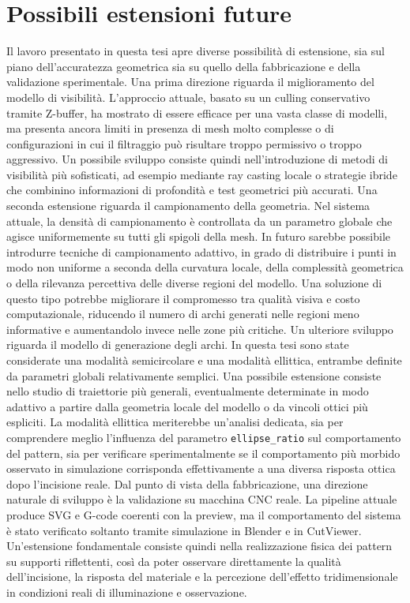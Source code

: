 \documentclass[a4paper,11pt,titlepage,twoside]{book}
\newcommand{\1}{\mathbf{1}}
\numberwithin{equation}{chapter}
\theoremstyle{plain}
\theoremstyle{definition}
\begin{document}
	\section{Possibili estensioni future}
	
	Il lavoro presentato in questa tesi apre diverse possibilità di estensione, sia sul piano dell’accuratezza geometrica sia su quello della fabbricazione e della validazione sperimentale. Una prima direzione riguarda il miglioramento del modello di visibilità. L’approccio attuale, basato su un culling conservativo tramite Z-buffer, ha mostrato di essere efficace per una vasta classe di modelli, ma presenta ancora limiti in presenza di mesh molto complesse o di configurazioni in cui il filtraggio può risultare troppo permissivo o troppo aggressivo. Un possibile sviluppo consiste quindi nell’introduzione di metodi di visibilità più sofisticati, ad esempio mediante ray casting locale o strategie ibride che combinino informazioni di profondità e test geometrici più accurati.
	Una seconda estensione riguarda il campionamento della geometria. Nel sistema attuale, la densità di campionamento è controllata da un parametro globale che agisce uniformemente su tutti gli spigoli della mesh. In futuro sarebbe possibile introdurre tecniche di campionamento adattivo, in grado di distribuire i punti in modo non uniforme a seconda della curvatura locale, della complessità geometrica o della rilevanza percettiva delle diverse regioni del modello. Una soluzione di questo tipo potrebbe migliorare il compromesso tra qualità visiva e costo computazionale, riducendo il numero di archi generati nelle regioni meno informative e aumentandolo invece nelle zone più critiche.
	Un ulteriore sviluppo riguarda il modello di generazione degli archi. In questa tesi sono state considerate una modalità semicircolare e una modalità ellittica, entrambe definite da parametri globali relativamente semplici. Una possibile estensione consiste nello studio di traiettorie più generali, eventualmente determinate in modo adattivo a partire dalla geometria locale del modello o da vincoli ottici più espliciti. La modalità ellittica meriterebbe un’analisi dedicata, sia per comprendere meglio l’influenza del parametro \texttt{ellipse\_ratio} sul comportamento del pattern, sia per verificare sperimentalmente se il comportamento più morbido osservato in simulazione corrisponda effettivamente a una diversa risposta ottica dopo l’incisione reale.
	Dal punto di vista della fabbricazione, una direzione naturale di sviluppo è la validazione su macchina CNC reale. La pipeline attuale produce SVG e G-code coerenti con la preview, ma il comportamento del sistema è stato verificato soltanto tramite simulazione in Blender e in CutViewer. Un’estensione fondamentale consiste quindi nella realizzazione fisica dei pattern su supporti riflettenti, così da poter osservare direttamente la qualità dell’incisione, la risposta del materiale e la percezione dell’effetto tridimensionale in condizioni reali di illuminazione e osservazione.
\end{document}
